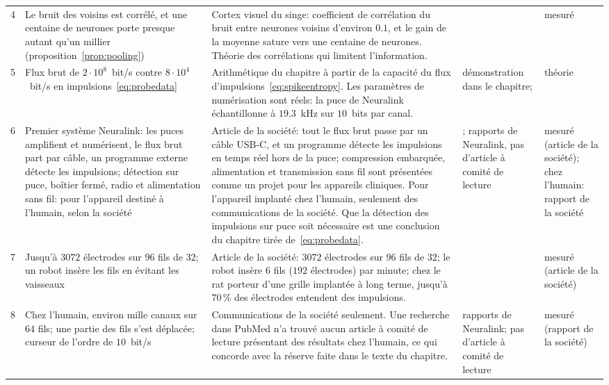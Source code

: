 {\begin{longtable}{>{\raggedright}p{0.5cm}>{\raggedright}p{4.0cm}>{\raggedright}p{5.6cm}>{\raggedright}p{2.3cm}>{\raggedright\arraybackslash}p{1.7cm}}
4 & Le bruit des voisins est corrélé, et une centaine de neurones porte presque autant qu'un millier (proposition~\ref{prop:pooling}) & Cortex visuel du singe: coefficient de corrélation du bruit entre neurones voisins d'environ $0.1$, et le gain de la moyenne sature vers une centaine de neurones. Théorie des corrélations qui limitent l'information. & \cite{Zohary1994, MorenoBote2014} & mesuré \\
5 & Flux brut de $2\cdot10^8$~bit/s contre $8\cdot10^4$~bit/s en impulsions~\eqref{eq:probedata} & Arithmétique du chapitre à partir de la capacité du flux d'impulsions~\eqref{eq:spikeentropy}. Les paramètres de numérisation sont réels: la puce de Neuralink échantillonne à $19.3$~kHz sur $10$~bits par canal. & démonstration dans le chapitre; \cite{Rieke1997, Musk2019} & théorie \\
6 & Premier système Neuralink: les puces amplifient et numérisent, le flux brut part par câble, un programme externe détecte les impulsions; détection sur puce, boîtier fermé, radio et alimentation sans fil: pour l'appareil destiné à l'humain, selon la société & Article de la société: tout le flux brut passe par un câble USB-C, et un programme détecte les impulsions en temps réel hors de la puce; compression embarquée, alimentation et transmission sans fil sont présentées comme un projet pour les appareils cliniques. Pour l'appareil implanté chez l'humain, seulement des communications de la société. Que la détection des impulsions sur puce soit nécessaire est une conclusion du chapitre tirée de~\eqref{eq:probedata}. & \cite{Musk2019}; rapports de Neuralink, pas d'article à comité de lecture & mesuré (article de la société); chez l'humain: rapport de la société \\
7 & Jusqu'à $3072$ électrodes sur $96$ fils de $32$; un robot insère les fils en évitant les vaisseaux & Article de la société: $3072$ électrodes sur $96$ fils de $32$; le robot insère $6$ fils ($192$ électrodes) par minute; chez le rat porteur d'une grille implantée à long terme, jusqu'à $70\,\%$ des électrodes entendent des impulsions. & \cite{Musk2019} & mesuré (article de la société) \\
8 & Chez l'humain, environ mille canaux sur $64$ fils; une partie des fils s'est déplacée; curseur de l'ordre de $10$~bit/s & Communications de la société seulement. Une recherche dans PubMed n'a trouvé aucun article à comité de lecture présentant des résultats chez l'humain, ce qui concorde avec la réserve faite dans le texte du chapitre. & rapports de Neuralink; pas d'article à comité de lecture & mesuré (rapport de la société) \\

\end{longtable}}
